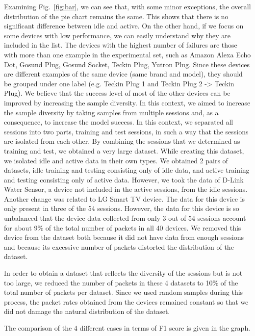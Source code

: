 \documentclass[journal]{IEEEtran}
\begin{document}
Examining Fig.~\ref{fig:bar}, we can see that, with some minor exceptions, the overall distribution of the pie chart remains the same. This shows that there is no significant difference between idle and active. On the other hand, if we focus on some devices with low performance, we can easily understand why they are included in the list. The devices with the highest number of failures are those with more than one example in the experimental set, such as Amazon Alexa Echo Dot, Gosund Plug, Gosund Socket, Teckin Plug, Yutron Plug. Since these devices are different examples of the same device (same brand and model), they should be grouped under one label (e.g. Teckin Plug 1 and Teckin Plug 2 -> Teckin Plug). We believe that the success level of most of the other devices can be improved by increasing the sample diversity. In this context, we aimed to increase the sample diversity by taking samples from multiple sessions and, as a consequence, to increase the model success.
In this context, we separated all sessions into two parts, training and test sessions, in such a way that the sessions are isolated from each other. By combining the sessions that we determined as training and test, we obtained a very large dataset. While creating this dataset, we isolated idle and active data in their own types. We obtained 2 pairs of datasets, idle training and testing consisting only of idle data, and active training and testing consisting only of active data. However, we took the data of D-Link Water Sensor, a device not included in the active sessions, from the idle sessions. Another change was related to LG Smart TV device. The data for this device is only present in three of the 54 sessions. However, the data for this device is so unbalanced that the device data collected from only 3 out of 54 sessions account for about 9\% of the total number of packets in all 40 devices. We removed this device from the dataset both because it did not have data from enough sessions and because its excessive number of packets distorted the distribution of the dataset.



In order to obtain a dataset that reflects the diversity of the sessions but is not too large, we reduced the number of packets in these 4 datasets to 10\% of the total number of packets per dataset. Since we used random samples during this process, the packet rates obtained from the devices remained constant so that we did not damage the natural distribution of the dataset.


The comparison of the 4 different cases in terms of F1 score is given in the graph.
\end{document}
